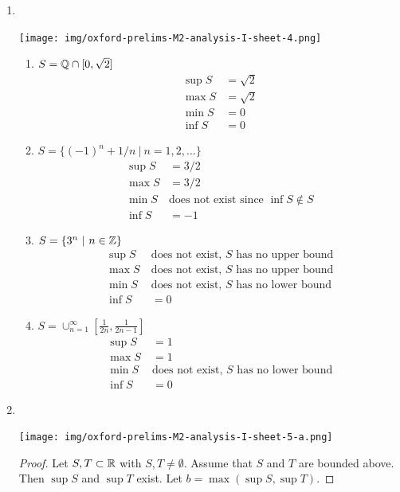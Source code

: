 \begin{enumerate}
\item~\\
  \begin{mdframed}
    \texttt{[image: img/oxford-prelims-M2-analysis-I-sheet-4.png]}
  \end{mdframed}
  \begin{enumerate}
  \item $S = \mathbb{Q} \cap [0, \sqrt 2]$
    \begin{align*}
      \sup S &= \sqrt 2\\
      \max S &= \sqrt 2\\
      \min S &= 0\\
      \inf S &= 0
    \end{align*}
  \item $S = \{(-1)^n + 1/n ~|~ n=1,2,\ldots\}$
    \begin{align*}
      \sup S &= 3/2\\
      \max S &= 3/2\\
      \min S ~&\text{does not exist since $\inf S \not\in S$}\\
      \inf S &= -1
    \end{align*}
  \item $S = \{3^n ~|~ n \in \mathbb{Z}\}$
    \begin{align*}
      \sup S ~&\text{does not exist, $S$ has no upper bound}\\
      \max S ~&\text{does not exist, $S$ has no upper bound}\\
      \min S ~&\text{does not exist, $S$ has no lower bound}\\
      \inf S &= 0
    \end{align*}
  \item $S = \cup_{n=1}^\infty [\frac{1}{2n}, \frac{1}{2n - 1}]$
    \begin{align*}
      \sup S ~&= 1\\
      \max S ~&= 1\\
      \min S ~&\text{does not exist, $S$ has no lower bound}\\
      \inf S ~&=0
    \end{align*}
  \end{enumerate}

\item~
  \begin{mdframed}
    \texttt{[image: img/oxford-prelims-M2-analysis-I-sheet-5-a.png]}
  \end{mdframed}

  \begin{proof}
    Let $S, T \subset \mathbb{R}$ with $S, T \neq \emptyset$. Assume that $S$ and $T$ are bounded
    above. Then $\sup S$ and $\sup T$ exist. Let $b = \max(\sup S, \sup T)$.


\end{proof}
\end{enumerate}
